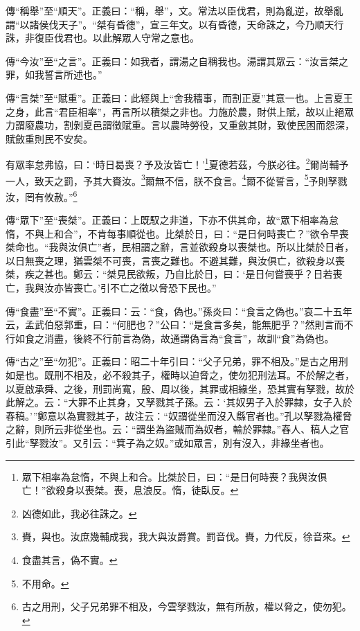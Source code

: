 {\noindent\zhuan{}\fzbyks 傳“稱舉”至“順天”。正義曰：“稱，舉”，文。常法以臣伐君，則為亂逆，故舉亂謂“以諸侯伐天子”。“桀有昏德”，宣三年文。以有昏德，天命誅之，今乃順天行誅，非復臣伐君也。以此解眾人守常之意也。 \par}

{\noindent\zhuan{}\fzbyks 傳“今汝”至“之言”。正義曰：如我者，謂湯之自稱我也。湯謂其眾云：“汝言桀之罪，如我誓言所述也。” \par}

{\noindent\zhuan{}\fzbyks 傳“言桀”至“賦重”。正義曰：此經與上“舍我穡事，而割正夏”其意一也。上言夏王之身，此言“君臣相率”，再言所以積桀之非也。力施於農，財供上賦，故以止絕眾力謂廢農功，割剝夏邑謂徵賦重。言以農時勞役，又重斂其財，致使民困而怨深，賦斂重則民不安矣。 \par}

有眾率怠弗協，曰：‘時日曷喪？予及汝皆亡！’\footnote{眾下相率為怠惰，不與上和合。比桀於日，曰：“是日何時喪？我與汝俱亡！”欲殺身以喪桀。喪，息浪反。惰，徒臥反。}夏德若茲，今朕必往。\footnote{凶德如此，我必往誅之。}爾尚輔予一人，致天之罰，予其大賚汝。\footnote{賚，與也。汝庶幾輔成我，我大與汝爵賞。罰音伐。賚，力代反，徐音來。}爾無不信，朕不食言。\footnote{食盡其言，偽不實。}爾不從誓言，\footnote{不用命。}予則孥戮汝，罔有攸赦。”\footnote{古之用刑，父子兄弟罪不相及，今雲孥戮汝，無有所赦，權以脅之，使勿犯。}

{\noindent\zhuan{}\fzbyks 傳“眾下”至“喪桀”。正義曰：上既馭之非道，下亦不供其命，故“眾下相率為怠惰，不與上和合”，不肯每事順從也。比桀於日，曰：“是日何時喪亡？”欲令早喪桀命也。“我與汝俱亡”者，民相謂之辭，言並欲殺身以喪桀也。所以比桀於日者，以日無喪之理，猶雲桀不可喪，言喪之難也。不避其難，與汝俱亡，欲殺身以喪桀，疾之甚也。鄭云：“桀見民欲叛，乃自比於日，曰：‘是日何嘗喪乎？日若喪亡，我與汝亦皆喪亡。’引不亡之徵以脅恐下民也。” \par}

{\noindent\zhuan{}\fzbyks 傳“食盡”至“不實”。正義曰：云：“食，偽也。”孫炎曰：“食言之偽也。”哀二十五年云，孟武伯惡郭重，曰：“何肥也？”公曰：“是食言多矣，能無肥乎？”然則言而不行如食之消盡，後終不行前言為偽，故通謂偽言為“食言”，故訓“食”為偽也。 \par}

{\noindent\zhuan{}\fzbyks 傳“古之”至“勿犯”。正義曰：昭二十年引曰：“父子兄弟，罪不相及。”是古之用刑如是也。既刑不相及，必不殺其子，權時以迫脅之，使勿犯刑法耳。不於解之者，以夏啟承舜、之後，刑罰尚寬，殷、周以後，其罪或相緣坐，恐其實有孥戮，故於此解之。云：“大罪不止其身，又孥戮其子孫。云：‘其奴男子入於罪隸，女子入於舂稿。’”鄭意以為實戮其子，故注云：“奴謂從坐而沒入縣官者也。”孔以孥戮為權脅之辭，則所云非從坐也。云：“謂坐為盜賊而為奴者，輸於罪隸。”舂人、稿人之官引此“孥戮汝”。又引云：“箕子為之奴。”或如眾言，別有沒入，非緣坐者也。 \par}

